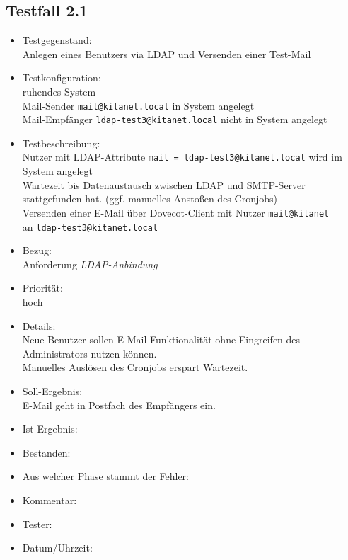 \subsection{Testfall 2.1}
\begin{itemize}
	\item Testgegenstand:\\
	Anlegen eines Benutzers via LDAP und Versenden einer Test-Mail
	\item Testkonfiguration:\\
	ruhendes System\\
	Mail-Sender \verb+mail@kitanet.local+ in System angelegt\\
	Mail-Empfänger \verb+ldap-test3@kitanet.local+ nicht in System angelegt
	\item Testbeschreibung:\\
	Nutzer mit LDAP-Attribute \verb+mail = ldap-test3@kitanet.local+ wird im System angelegt\\
	Wartezeit bis Datenaustausch zwischen LDAP und SMTP-Server stattgefunden hat. (ggf. manuelles Anstoßen des Cronjobs)\\
	Versenden einer E-Mail über Dovecot-Client mit Nutzer \verb+mail@kitanet+ \\ an \verb+ldap-test3@kitanet.local+
	\item Bezug:\\
	Anforderung \textit{LDAP-Anbindung}
	\item Priorität:\\
	hoch
	\item Details:\\
	Neue Benutzer sollen E-Mail-Funktionalität ohne Eingreifen des Administrators nutzen können.\\
	Manuelles Auslösen des Cronjobs erspart Wartezeit.
	\item Soll-Ergebnis:\\
	E-Mail geht in Postfach des Empfängers ein.
	\item Ist-Ergebnis:\\
	\item Bestanden:\\
	\item Aus welcher Phase stammt der Fehler:\\
	\item Kommentar:\\
	\item Tester:\\
	\item Datum/Uhrzeit:\\
\end{itemize}

